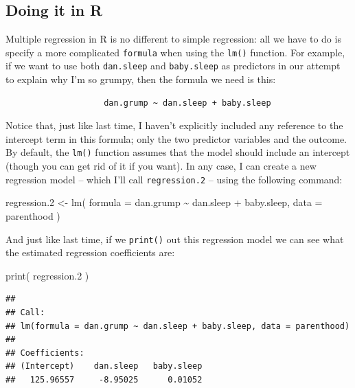 \documentclass[
]{book}
\newenvironment{Shaded}{\begin{snugshade}}{\end{snugshade}}
\newcommand{\AttributeTok}[1]{\textcolor[rgb]{0.77,0.63,0.00}{#1}}
\newcommand{\FloatTok}[1]{\textcolor[rgb]{0.00,0.00,0.81}{#1}}
\newcommand{\FunctionTok}[1]{\textcolor[rgb]{0.00,0.00,0.00}{#1}}
\newcommand{\NormalTok}[1]{#1}
\newcommand{\OtherTok}[1]{\textcolor[rgb]{0.56,0.35,0.01}{#1}}
\newcommand{\SpecialCharTok}[1]{\textcolor[rgb]{0.00,0.00,0.00}{#1}}
\begin{document}
\hypertarget{doing-it-in-r}{%
\subsection{Doing it in R}\label{doing-it-in-r}}

Multiple regression in R is no different to simple regression: all we have to do is specify a more complicated \texttt{formula} when using the \texttt{lm()} function. For example, if we want to use both \texttt{dan.sleep} and \texttt{baby.sleep} as predictors in our attempt to explain why I'm so grumpy, then the formula we need is this:

\begin{verbatim}
                    dan.grump ~ dan.sleep + baby.sleep
\end{verbatim}

Notice that, just like last time, I haven't explicitly included any reference to the intercept term in this formula; only the two predictor variables and the outcome. By default, the \texttt{lm()} function assumes that the model should include an intercept (though you can get rid of it if you want). In any case, I can create a new regression model -- which I'll call \texttt{regression.2} -- using the following command:

\begin{Shaded}
\begin{Highlighting}[]
\NormalTok{regression}\FloatTok{.2} \OtherTok{\textless{}{-}} \FunctionTok{lm}\NormalTok{( }\AttributeTok{formula =}\NormalTok{ dan.grump }\SpecialCharTok{\textasciitilde{}}\NormalTok{ dan.sleep }\SpecialCharTok{+}\NormalTok{ baby.sleep,  }
                     \AttributeTok{data =}\NormalTok{ parenthood )}
\end{Highlighting}
\end{Shaded}

And just like last time, if we \texttt{print()} out this regression model we can see what the estimated regression coefficients are:

\begin{Shaded}
\begin{Highlighting}[]
\FunctionTok{print}\NormalTok{( regression}\FloatTok{.2}\NormalTok{ )}
\end{Highlighting}
\end{Shaded}

\begin{verbatim}
## 
## Call:
## lm(formula = dan.grump ~ dan.sleep + baby.sleep, data = parenthood)
## 
## Coefficients:
## (Intercept)    dan.sleep   baby.sleep  
##   125.96557     -8.95025      0.01052
\end{verbatim}
\end{document}
